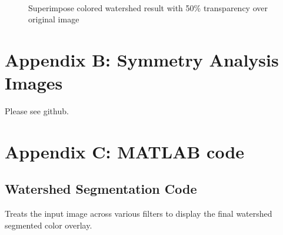 \documentclass[12pt]{article}
\theoremstyle{plain}%
\theoremstyle{definition}
\theoremstyle{remark}
\begin{document}
\begin{figure}[!h]
\centering
\mbox{\quad
{}}
\caption{Superimpose colored watershed result with 50\% transparency over original image}
\end{figure}
\section{Appendix B: Symmetry Analysis Images}
Please see github.
\section{Appendix C: \textsc{MATLAB} code}
\subsection{Watershed Segmentation Code}
Treats the input image across various filters to display the final watershed segmented color overlay.
\end{document}
